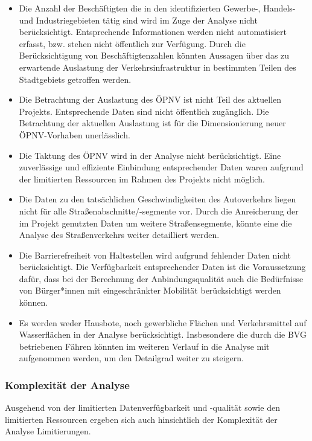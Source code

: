 \begin{itemize}

    \item Die Anzahl der Beschäftigten die in den identifizierten Gewerbe-, Handels- und Industriegebieten tätig sind wird im Zuge der Analyse nicht berücksichtigt. Entsprechende Informationen werden nicht automatisiert erfasst, bzw. stehen nicht öffentlich zur Verfügung. Durch die Berücksichtigung von Beschäftigtenzahlen könnten Aussagen über das zu erwartende Auslastung der Verkehrsinfrastruktur in bestimmten Teilen des Stadtgebiets getroffen werden.

    \item Die Betrachtung der Auslastung des ÖPNV ist nicht Teil des aktuellen Projekts. Entsprechende Daten sind nicht öffentlich zugänglich. Die Betrachtung der aktuellen Auslastung ist für die Dimensionierung neuer ÖPNV-Vorhaben unerlässlich.

    \item Die Taktung des ÖPNV wird in der Analyse nicht berücksichtigt​. Eine zuverlässige und effiziente Einbindung entsprechender Daten waren aufgrund der limitierten Ressourcen im Rahmen des Projekts nicht möglich.

    \item Die Daten zu den tatsächlichen Geschwindigkeiten des Autoverkehrs liegen nicht für alle Straßenabschnitte/-segmente vor​. Durch die Anreicherung der im Projekt genutzten Daten um weitere Straßensegmente, könnte eine die Analyse des Straßenverkehrs weiter detailliert werden.

    \item Die Barrierefreiheit von Haltestellen wird aufgrund fehlender Daten nicht berücksichtigt​. Die Verfügbarkeit entsprechender Daten ist die Voraussetzung dafür, dass bei der Berechnung der Anbindungsqualität auch die Bedürfnisse von Bürger*innen mit eingeschränkter Mobilität berücksichtigt werden können.

    \item Es werden weder Hausbote, noch gewerbliche Flächen und Verkehrsmittel auf Wasserflächen in der Analyse berücksichtigt. Insbesondere die durch die BVG betriebenen Fähren könnten im weiteren Verlauf in die Analyse mit aufgenommen werden, um den Detailgrad weiter zu steigern.

\end{itemize}

\subsubsection{Komplexität der Analyse}
Ausgehend von der limitierten Datenverfügbarkeit und -qualität sowie den limitierten Ressourcen ergeben sich auch hinsichtlich der Komplexität der Analyse Limitierungen.


